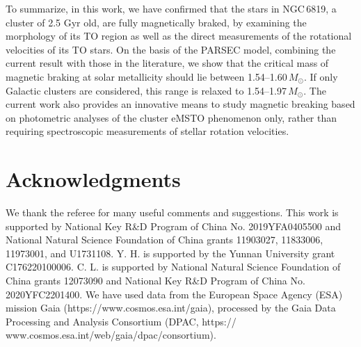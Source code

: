 \documentclass[twocolumn]{aastex631}
\begin{document}
To summarize, in this work, we have confirmed that the stars in NGC\,6819, a cluster of 2.5 Gyr old, are fully magnetically braked, by examining the morphology of its TO region as well as the direct measurements of the rotational velocities of its TO stars. On the basis of the PARSEC model, combining the current result with those in the literature, we show that the critical mass of magnetic braking at solar metallicity should lie between 1.54--1.60\,$M_{\odot}$. If only Galactic clusters are considered, this range is relaxed to 1.54--1.97\,$M_{\odot}$. The current work also provides an innovative means to study magnetic breaking based on photometric analyses of the cluster eMSTO phenomenon only, rather than requiring spectroscopic measurements of stellar rotation velocities.


\section*{Acknowledgments}
We thank the referee for many useful comments and suggestions. This work is supported by National Key R\&D Program of China No. 2019YFA0405500 and National Natural Science Foundation of China grants 11903027, 11833006, 11973001, and U1731108. Y. H. is supported by the Yunnan University grant C176220100006. C. L. is supported by National Natural Science Foundation of China grants 12073090 and National Key R\&D Program of China No. 2020YFC2201400. We have used data from the European Space Agency (ESA) mission Gaia (https://www.cosmos.esa.int/gaia), processed by the Gaia Data Processing and Analysis Consortium (DPAC, https:// www.cosmos.esa.int/web/gaia/dpac/consortium).


{}

\end{document}
